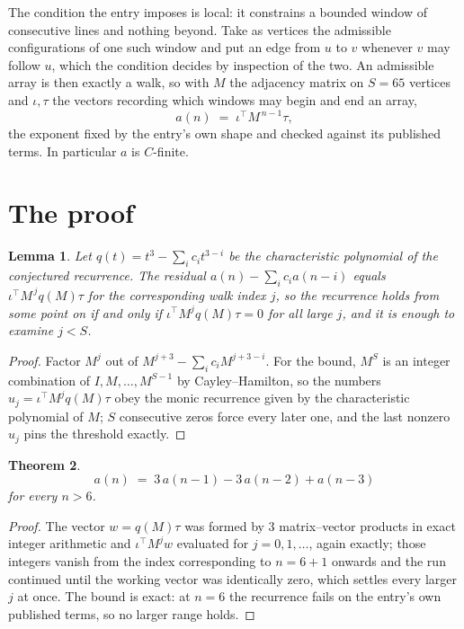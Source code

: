 \documentclass[11pt,a4paper]{article}
\theoremstyle{plain}
\newtheorem{theorem}{Theorem}
\newtheorem{lemma}[theorem]{Lemma}
\theoremstyle{definition}
\begin{document}
The condition the entry imposes is local: it constrains a bounded window of consecutive lines and nothing beyond. Take as
vertices the admissible configurations of one such window and put an edge from $u$ to $v$
whenever $v$ may follow $u$, which the condition decides by inspection of the two. An
admissible array is then exactly a walk, so with $M$ the adjacency matrix on $S=65$ vertices
and $\iota,\tau$ the vectors recording which windows may begin and end an array,
\[
a(n)\;=\;\iota^{\!\top}M^{\,n-1}\tau ,
\]
the exponent fixed by the entry's own shape and checked against its published terms. In
particular $a$ is $C$-finite.

\section{The proof}

\begin{lemma}\label{lem:crit}
Let $q(t)=t^{3}-\sum_i c_it^{3-i}$ be the characteristic polynomial of the
conjectured recurrence. The residual $a(n)-\sum_ic_ia(n-i)$ equals
$\iota^{\!\top}M^{\,j}q(M)\tau$ for the corresponding walk index $j$, so the recurrence
holds from some point on if and only if $\iota^{\!\top}M^{j}q(M)\tau=0$ for all large $j$,
and it is enough to examine $j<S$.
\end{lemma}

\begin{proof}
Factor $M^{j}$ out of $M^{j+3}-\sum_ic_iM^{j+3-i}$. For the bound, $M^{S}$
is an integer combination of $I,M,\dots,M^{S-1}$ by Cayley--Hamilton, so the numbers
$u_j=\iota^{\!\top}M^{j}q(M)\tau$ obey the monic recurrence given by the characteristic
polynomial of $M$; $S$ consecutive zeros force every later one, and the last nonzero $u_j$
pins the threshold exactly.
\end{proof}

\begin{theorem}
\[
a(n)\;=\;3\,a(n-1) - 3\,a(n-2) + a(n-3)
\]
for every $n>6$.
\end{theorem}

\begin{proof}
The vector $w=q(M)\tau$ was formed by $3$ matrix--vector products in exact integer
arithmetic and $\iota^{\!\top}M^{j}w$ evaluated for $j=0,1,\dots$, again exactly; those
integers vanish from the index corresponding to $n=6+1$ onwards and the run continued
until the working vector was identically zero, which settles every larger $j$ at once. The bound is exact: at $n=6$ the recurrence fails on the entry's own published terms, so no larger range holds.
\end{proof}
\end{document}
